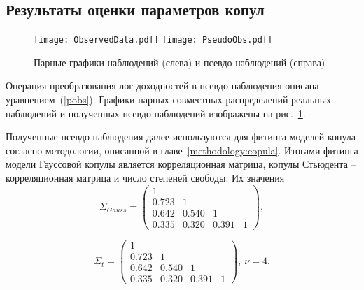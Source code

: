 
\subsection{Результаты оценки параметров копул}

\begin{figure}[thb]
  \centering
  \texttt{[image: ObservedData.pdf]}
  \texttt{[image: PseudoObs.pdf]}
  \caption{Парные графики наблюдений (слева) и псевдо-наблюдений (справа)}
  \label{ris:pobs}
\end{figure}


Операция преобразования лог-доходностей в псевдо-наблюдения описана уравнением~(\ref{pobs}).
Графики парных совместных распределений реальных наблюдений и полученных псевдо-наблюдений изображены на рис.~\ref{ris:pobs}.

Полученные псевдо-наблюдения далее используются для фитинга моделей копула согласно методологии, описанной в главе~\ref{methodology:copula}.
Итогами фитинга модели Гауссовой копулы является корреляционная матрица, копулы Стьюдента -- корреляционная матрица и число степеней свободы. Их значения
%
\begin{equation} \label{gausscopfit}
    \Sigma_{Gauss} = \left(
    \begin{array}{cccc}
        1 & & & \\
        0.723 & 1 & & \\
        0.642 & 0.540 & 1 & \\
        0.335 & 0.320 & 0.391 & 1
    \end{array} \right),
\end{equation}

\begin{equation} \label{tcopfit}
    \Sigma_t = \left(
    \begin{array}{cccc}
        1 & & & \\
        0.723 & 1 & & \\
        0.642 & 0.540 & 1 & \\
        0.335 & 0.320 & 0.391 & 1
    \end{array} \right), \ \nu = 4.
\end{equation}

